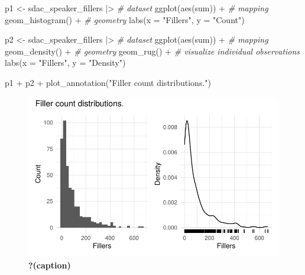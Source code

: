 \documentclass[
  letterpaper,
]{scrbook}
\newenvironment{Shaded}{\begin{snugshade}}{\end{snugshade}}
\newcommand{\AttributeTok}[1]{\textcolor[rgb]{0.00,0.00,0.00}{#1}}
\newcommand{\CommentTok}[1]{\textcolor[rgb]{0.00,0.00,0.00}{\textit{#1}}}
\newcommand{\FunctionTok}[1]{\textcolor[rgb]{0.00,0.00,0.00}{#1}}
\newcommand{\NormalTok}[1]{\textcolor[rgb]{0.00,0.00,0.00}{#1}}
\newcommand{\OtherTok}[1]{\textcolor[rgb]{0.00,0.00,0.00}{#1}}
\newcommand{\SpecialCharTok}[1]{\textcolor[rgb]{0.00,0.00,0.00}{#1}}
\newcommand{\StringTok}[1]{\textcolor[rgb]{0.00,0.00,0.00}{#1}}
\begin{document}
\begin{Shaded}
\begin{Highlighting}[]
\NormalTok{p1 }\OtherTok{\textless{}{-}} 
\NormalTok{  sdac\_speaker\_fillers }\SpecialCharTok{|\textgreater{}} \CommentTok{\# dataset}
  \FunctionTok{ggplot}\NormalTok{(}\FunctionTok{aes}\NormalTok{(sum)) }\SpecialCharTok{+} \CommentTok{\# mapping}
  \FunctionTok{geom\_histogram}\NormalTok{() }\SpecialCharTok{+}  \CommentTok{\# geometry}
  \FunctionTok{labs}\NormalTok{(}\AttributeTok{x =} \StringTok{"Fillers"}\NormalTok{, }\AttributeTok{y =} \StringTok{"Count"}\NormalTok{)}

\NormalTok{p2 }\OtherTok{\textless{}{-}} 
\NormalTok{  sdac\_speaker\_fillers }\SpecialCharTok{|\textgreater{}} \CommentTok{\# dataset}
  \FunctionTok{ggplot}\NormalTok{(}\FunctionTok{aes}\NormalTok{(sum)) }\SpecialCharTok{+} \CommentTok{\# mapping}
  \FunctionTok{geom\_density}\NormalTok{() }\SpecialCharTok{+} \CommentTok{\# geometry}
  \FunctionTok{geom\_rug}\NormalTok{() }\SpecialCharTok{+}  \CommentTok{\# visualize individual observations}
  \FunctionTok{labs}\NormalTok{(}\AttributeTok{x =} \StringTok{"Fillers"}\NormalTok{, }\AttributeTok{y =} \StringTok{"Density"}\NormalTok{)}

\NormalTok{p1 }\SpecialCharTok{+}\NormalTok{ p2 }\SpecialCharTok{+} \FunctionTok{plot\_annotation}\NormalTok{(}\StringTok{"Filler count distributions."}\NormalTok{)}
\end{Highlighting}
\end{Shaded}

\begin{figure}[h]

{\centering \includegraphics{./inference_files/figure-pdf/fig-i-uni-cont-sdac-visual-1.pdf}

}

\caption{\label{fig-i-uni-cont-sdac-visual}\textbf{?(caption)}}

\end{figure}
\end{document}
